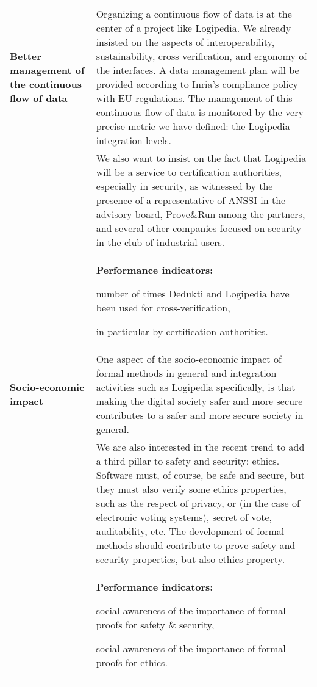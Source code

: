 \begin{longtable}{|p{}|p{}|}
\hline
{\bf Better management of the continuous flow of data}
&
Organizing a continuous flow of data is at the center of a project
like Logipedia. We already insisted on the aspects of interoperability,
sustainability, cross verification, and ergonomy of the interfaces. 
A data management plan will be provided according to Inria's compliance
policy with EU regulations.
The management of this continuous flow of data is monitored by the 
very precise metric we have defined: the Logipedia integration levels.
\\
&
\hspace{0.4cm}
We also want to insist on the fact that Logipedia will be a service to
certification authorities, especially in security, as witnessed by the
presence of a representative of ANSSI in the advisory board,
Prove\&Run among the partners, and several other companies focused on
security in the club of industrial users.\\
&
\colorbox{color3}{\bf Performance indicators:}
\begin{compactitem}
\item number of times Dedukti and Logipedia have been used for 
cross-verification, 
\item in particular by certification authorities. 
\end{compactitem}
\\
\hline
{\bf Socio-economic impact}
&
One aspect of the socio-economic impact of formal methods in general
and integration activities such as Logipedia specifically, is that making the
digital society safer and more secure contributes to a safer and more
secure society in general.\\
&
\hspace{0.4cm} 
We are also interested in the recent trend to add a third pillar to
safety and security: ethics.  Software must, of course, be safe and
secure, but they must also verify some ethics properties, such as
the respect of privacy, or (in the case of electronic voting systems), 
secret of vote, auditability, etc.
The development of formal methods should contribute to prove 
safety and security properties, but also ethics property.
\\
&
\colorbox{color3}{\bf Performance indicators:}
\begin{compactitem}
\item social awareness of the importance of formal proofs for safety \&
security, 
\item social awareness of the importance of formal proofs for ethics.

\end{compactitem}
\end{longtable}
